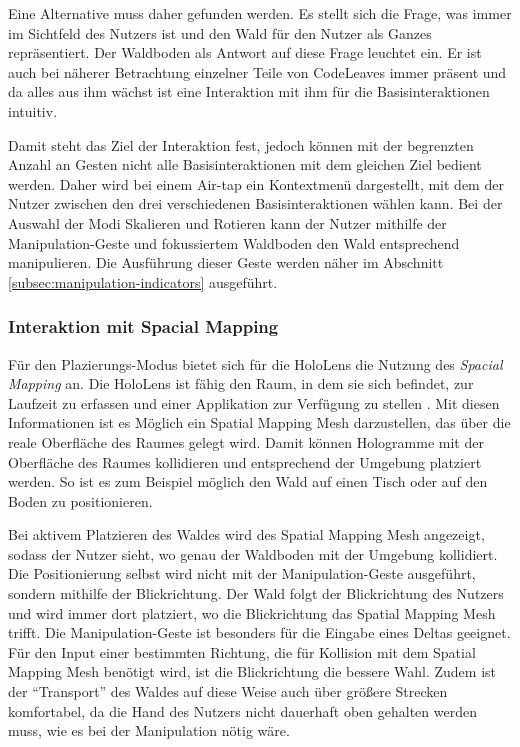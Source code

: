 Eine Alternative muss daher gefunden werden. Es stellt sich die Frage, was immer im Sichtfeld des Nutzers ist und den Wald für den Nutzer als Ganzes repräsentiert. Der Waldboden als Antwort auf diese Frage leuchtet ein. Er ist auch bei näherer Betrachtung einzelner Teile von CodeLeaves immer präsent und da alles aus ihm wächst ist eine Interaktion mit ihm für die Basisinteraktionen intuitiv.

Damit steht das Ziel der Interaktion fest, jedoch können mit der begrenzten Anzahl an Gesten nicht alle Basisinteraktionen mit dem gleichen Ziel bedient werden. Daher wird bei einem Air-tap ein Kontextmenü dargestellt, mit dem der Nutzer zwischen den drei verschiedenen Basisinteraktionen wählen kann. Bei der Auswahl der Modi Skalieren und Rotieren kann der Nutzer mithilfe der Manipulation-Geste und fokussiertem Waldboden den Wald entsprechend manipulieren. Die Ausführung dieser Geste werden näher im Abschnitt \ref{subsec:manipulation-indicators} ausgeführt.

\subsubsection*{Interaktion mit Spacial Mapping}
Für den Plazierungs-Modus bietet sich für die HoloLens die Nutzung des \textit{Spacial Mapping} an. Die HoloLens ist fähig den Raum, in dem sie sich befindet, zur Laufzeit zu erfassen und einer Applikation zur Verfügung zu stellen \cite{windows2017spacial}. Mit diesen Informationen ist es Möglich ein Spatial Mapping Mesh darzustellen, das über die reale Oberfläche des Raumes gelegt wird. Damit können Hologramme mit der Oberfläche des Raumes kollidieren und entsprechend der Umgebung platziert werden. So ist es zum Beispiel möglich den Wald auf einen Tisch oder auf den Boden zu positionieren.

Bei aktivem Platzieren des Waldes wird des Spatial Mapping Mesh angezeigt, sodass der Nutzer sieht, wo genau der Waldboden mit der Umgebung kollidiert. Die Positionierung selbst wird nicht mit der Manipulation-Geste ausgeführt, sondern mithilfe der Blickrichtung. Der Wald folgt der Blickrichtung des Nutzers und wird immer dort platziert, wo die Blickrichtung das Spatial Mapping Mesh trifft. Die Manipulation-Geste ist besonders für die Eingabe eines Deltas geeignet. Für den Input einer bestimmten Richtung, die für Kollision mit dem Spatial Mapping Mesh benötigt wird, ist die Blickrichtung die bessere Wahl. Zudem ist der "`Transport"' des Waldes auf diese Weise auch über größere Strecken komfortabel, da die Hand des Nutzers nicht dauerhaft oben gehalten werden muss, wie es bei der Manipulation nötig wäre. 

